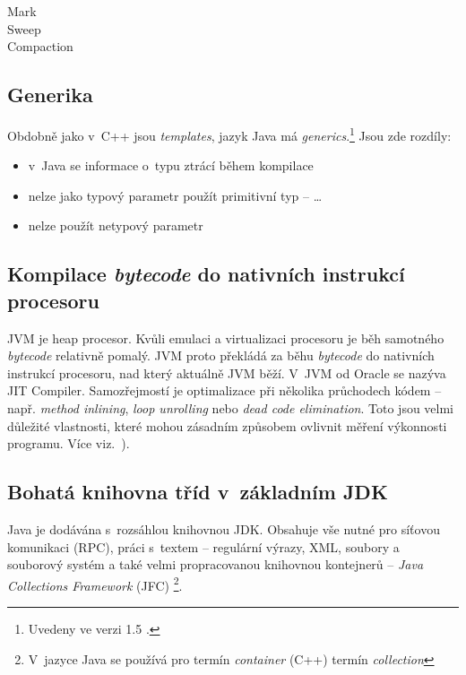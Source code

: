 \begin{description}
  \item[Mark] 
  \item[Sweep] 
  \item[Compaction]
\end{description}

\subsection{Generika}

Obdobně jako v~C++ jsou \emph{templates}\cite{ISO:2012:CPP}, jazyk Java má \emph{generics}.\footnote{Uvedeny ve verzi 1.5 \cite{gosling2013java}.}
Jsou zde rozdíly:
\begin{itemize}
  \item v~Java se informace o~typu ztrácí během kompilace
  \item nelze jako typový parametr použít primitivní typ --  \ldots{}
  \item nelze použít netypový parametr
\end{itemize}

\subsection{Kompilace \emph{bytecode} do nativních instrukcí procesoru}

JVM je heap procesor. Kvůli emulaci a virtualizaci procesoru je
běh samotného \emph{bytecode} relativně pomalý. JVM proto překládá
za běhu \emph{bytecode} do nativních instrukcí procesoru, nad který
aktuálně JVM běží. V~JVM od Oracle %
 se nazýva JIT Compiler\cite{hunt2011java}. Samozřejmostí je optimalizace při několika průchodech
kódem -- např. \emph{method inlining}, \emph{loop unrolling} nebo \emph{dead code elimination}\cite{hunt2011java}. Toto jsou velmi důležité vlastnosti, které mohou zásadním způsobem
ovlivnit měření výkonnosti programu. Více viz.~).


\subsection{Bohatá knihovna tříd v~základním JDK}

Java je dodávána s~rozsáhlou knihovnou JDK. Obsahuje vše nutné
pro síťovou komunikaci (RPC), práci s~textem -- regulární výrazy,
XML, soubory a souborový
systém a také velmi propracovanou knihovnou kontejnerů -- \emph{Java
Collections Framework }(JFC)
\footnote{V~jazyce Java se používá pro termín\emph{ container} (C++) termín
\emph{collection}}.

